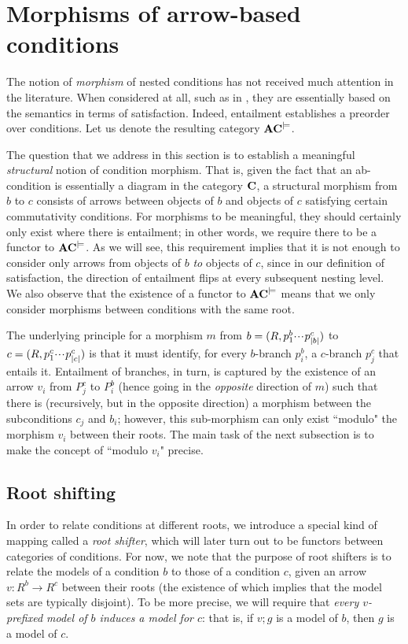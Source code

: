 \section{Morphisms of arrow-based conditions}

The notion of \emph{morphism} of nested conditions has not received much attention in the literature. When considered at all, such as in \cite{bchk:conditional-reactive-systems,sksclo:coinductive-techniques-for-satisfiability}, they are essentially based on the semantics in terms of satisfaction. Indeed, entailment establishes a preorder over conditions. Let us denote the resulting category $\mathbf{AC}^{\models}$.

The question that we address in this section is to establish a meaningful \emph{structural} notion of condition morphism. That is, given the fact that an ab-condition is essentially a diagram in the category $\mathbf{C}$, a structural morphism from $b$ to $c$ consists of arrows between objects of $b$ and objects of $c$ satisfying certain commutativity conditions. For morphisms to be meaningful, they should certainly only exist where there is entailment; in other words, we require there to be a functor to $\mathbf{AC}^{\models}$. As we will see, this requirement implies that it is not enough to consider only arrows from objects of $b$ \emph{to} objects of $c$, since in our definition of satisfaction, the direction of entailment flips at every subsequent nesting level. We also observe that the existence of a functor to $\mathbf{AC}^{\models}$ means that we only consider morphisms between conditions with the same root.

The underlying principle for a morphism $m$ from $b=(R,p^b_1{\cdotp\mkern-2mu\cdotp\mkern-2mu\cdotp\mkern1mu} p^c_{|b|})$ to $c=(R,p^c_1{\cdotp\mkern-2mu\cdotp\mkern-2mu\cdotp\mkern1mu} p^c_{|c|})$ is that it must identify, for every $b$-branch $p^b_i$, a $c$-branch $p^c_j$ that entails it. Entailment of branches, in turn, is captured by the existence of an arrow $v_i$ from $P^c_j$ to $P^b_i$ (hence going in the \emph{opposite} direction of $m$) such that there is (recursively, but in the opposite direction) a morphism between the subconditions $c_j$ and $b_i$; however, this sub-morphism can only exist ``modulo" the morphism $v_i$ between their roots. The main task of the next subsection is to make the concept of ``modulo $v_i$" precise.

\subsection{Root shifting}

In order to relate conditions at different roots, we introduce a special kind of mapping called a \emph{root shifter}, which will later turn out to be functors between categories of conditions. For now, we note that the purpose of root shifters is to relate the models of a condition $b$ to those of a condition $c$, given an arrow $v:R^b\to R^c$ between their roots (the existence of which implies that the model sets are typically disjoint). To be more precise, we will require that \emph{every $v$-prefixed model of $b$ induces a model for $c$}: that is, if $v;g$ is a model of $b$, then $g$ is a model of $c$.

